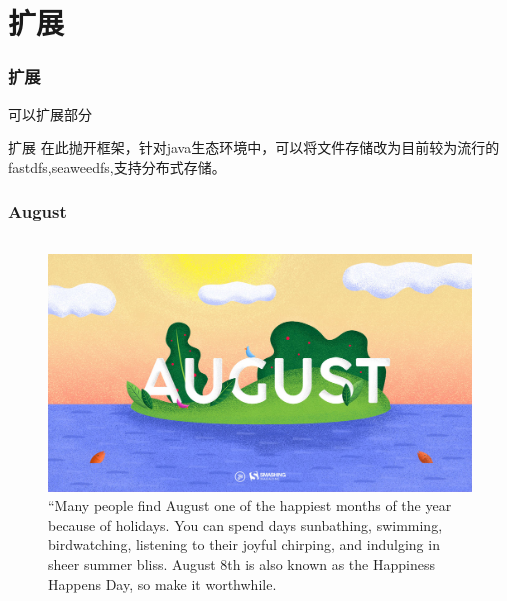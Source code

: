 \documentclass[hyperref={bookmarks=false},aspectratio=169]{beamer}
\begin{document}
\section{扩展}

\begin{frame}
\frametitle{扩展}

可以扩展部分

\begin{block}{扩展}
在此抛开框架，针对java生态环境中，可以将文件存储改为目前较为流行的fastdfs,seaweedfs,支持分布式存储。

\end{block}


\end{frame}
\begin{frame}
\frametitle{August}

\begin{columns}[t]
\begin{figure}
    \centering
    \includegraphics[width=\columnwidth]{./figures/august-nocal.jpg}
    \caption{``Many people find August one of the happiest months of the year because of holidays. You can spend days sunbathing, swimming, birdwatching, listening to their joyful chirping, and indulging in sheer summer bliss. August 8th is also known as the Happiness Happens Day, so make it worthwhile.} 

\end{figure}



\end{columns}
\end{frame}
\end{document}
